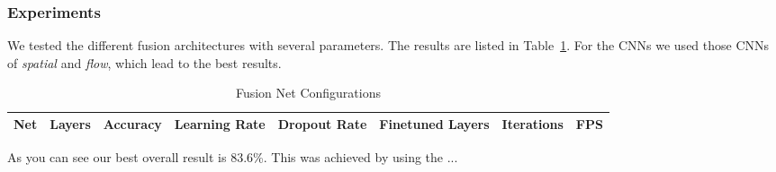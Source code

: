 \subsubsection{Experiments}

We tested the different fusion architectures with several parameters.
The results are listed in Table~\ref{table:fusion_results}.
For the CNNs we used those CNNs of \emph{spatial} and \emph{flow}, which lead to the best results.

\begin{table}[H]
\centering
\caption{Fusion Net Configurations}
\label{table:fusion_results}
\begin{tabularx}{\textwidth}{XXXXXXXX}
\toprule
Net 		& Layers	& Accuracy	& Learning Rate 	& Dropout Rate	& Finetuned Layers	& Iterations	& FPS\\ \midrule
\bottomrule
\end{tabularx}
\end{table}

As you can see our best overall result is 83.6\%.
This was achieved by using the ...